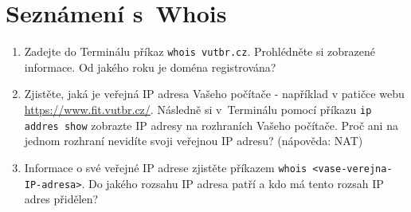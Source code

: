 \section{Seznámení s~Whois}
\begin{enumerate}
    \item Zadejte do Terminálu příkaz \texttt{whois vutbr.cz}. Prohlédněte si zobrazené informace. Od jakého roku je doména registrována?
    \item Zjistěte, jaká je veřejná IP adresa Vašeho počítače - například v patičce webu \url{https://www.fit.vutbr.cz/}. Následně si v~Terminálu pomocí příkazu \texttt{ip addres show} zobrazte IP adresy na rozhraních Vašeho počítače. Proč ani na jednom rozhraní nevidíte svoji veřejnou IP adresu? (nápověda: NAT)
    \item Informace o své veřejné IP adrese zjistěte příkazem \texttt{whois <vase-verejna-IP-adresa>}. Do jakého rozsahu IP adresa patří a kdo má tento rozsah IP adres přidělen?
\end{enumerate}


